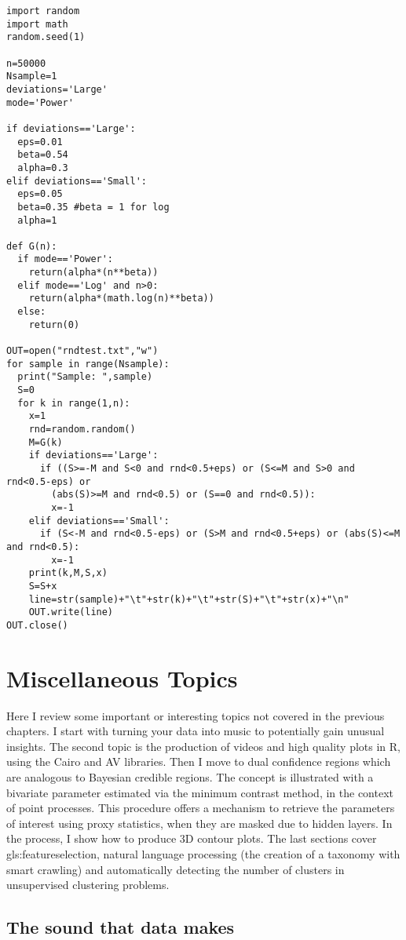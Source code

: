 \documentclass[oneside,10pt]{book}
\newcommand\Chapter[2]{
  \chapter[#1]{#1\\[2ex]\Large\itshape#2}
}
\begin{document}
\begin{lstlisting}
import random
import math
random.seed(1)

n=50000
Nsample=1
deviations='Large'
mode='Power'

if deviations=='Large':
  eps=0.01
  beta=0.54
  alpha=0.3
elif deviations=='Small':
  eps=0.05
  beta=0.35 #beta = 1 for log
  alpha=1

def G(n):
  if mode=='Power':
    return(alpha*(n**beta))
  elif mode=='Log' and n>0:
    return(alpha*(math.log(n)**beta))
  else:
    return(0)

OUT=open("rndtest.txt","w")
for sample in range(Nsample):
  print("Sample: ",sample)
  S=0
  for k in range(1,n):
    x=1
    rnd=random.random()
    M=G(k)
    if deviations=='Large':
      if ((S>=-M and S<0 and rnd<0.5+eps) or (S<=M and S>0 and rnd<0.5-eps) or
        (abs(S)>=M and rnd<0.5) or (S==0 and rnd<0.5)):
        x=-1
    elif deviations=='Small':
      if (S<-M and rnd<0.5-eps) or (S>M and rnd<0.5+eps) or (abs(S)<=M and rnd<0.5):
        x=-1
    print(k,M,S,x)
    S=S+x
    line=str(sample)+"\t"+str(k)+"\t"+str(S)+"\t"+str(x)+"\n"
    OUT.write(line)
OUT.close()
\end{lstlisting}

\Chapter{Miscellaneous Topics}{}

Here I review some important or interesting topics not covered in the previous chapters. I start with turning your data into music to
potentially gain unusual insights. The second topic is the production of videos and high quality plots in R, using the Cairo and AV libraries. Then I move to dual confidence regions which are analogous to Bayesian credible regions. The concept
 is illustrated with a bivariate parameter estimated via the minimum contrast method, in the context of point processes. This procedure offers a mechanism to retrieve
 the parameters of interest using proxy statistics, when they are masked due to  hidden layers. In the process, I show how to produce 3D contour plots. The last sections cover \gls{gls:featureselection},  natural language
 processing (the creation of a taxonomy with smart crawling) and automatically detecting the number of clusters in unsupervised clustering problems.


\hypersetup{linkcolor=red}


\section{The sound that data makes}\label{sound23}
\end{document}
